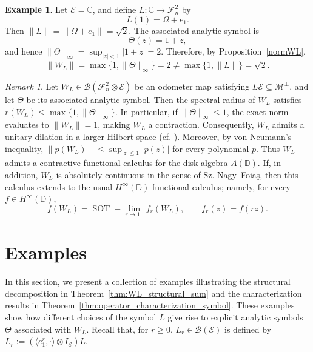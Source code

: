 \documentclass[12pt]{amsart}
\theoremstyle{definition}
\newtheorem{example}[theorem]{Example}
\theoremstyle{remark}
\newtheorem{remark}[theorem]{Remark}
\def \D{\mathbb{D}}
\newcommand{\clb}{\mathcal{B}}
\newcommand{\cle}{\mathcal{E}}
\newcommand{\clm}{\mathcal{M}}
\newcommand{\clf}{\mathcal{F}}
\numberwithin{equation}{section}
\begin{document}
\begin{example}
Let $\cle = \mathbb{C}$, and define $L: \mathbb C \to \clf_n^2 $ by
\[
L(1)=\Omega + e_1.
\]
Then $\|L\|
=
\|\Omega + e_1\|
=
\sqrt{2}.$
The associated analytic symbol is
\[
\Theta(z)=1+z,
\]
and hence $\|\Theta\|_\infty
=
\sup_{|z|<1}|1+z|
=
2.$
Therefore, by Proposition~\ref{normWL},
$$\|W_L\|
=
\max\{1,\|\Theta\|_\infty\}
=
2
\neq
\max\{1,\|L\|\}
=
\sqrt{2}.$$
\end{example}

\begin{remark}
Let $W_L \in \clb(\clf_n^2\otimes\cle)$ be an odometer map satisfying
$L\cle\subseteq \clm^\perp$, and let $\Theta$ be its associated analytic
symbol. Then the spectral radius of $W_L$ satisfies $r(W_L)\le \max\{1,\|\Theta\|_\infty\}.$
In particular, if $\|\Theta\|_\infty\le 1$,  the exact norm evaluates to $\|W_L\| = 1$, making $W_L$ a contraction. Consequently, $W_L$ admits a unitary dilation in a larger Hilbert space (cf. \cite{SzNagyFoias,Paulsen2002,Pisier2001}). Moreover, by von Neumann's inequality,
$\|p(W_L)\| \le \sup_{|z|\le 1}|p(z)|$
for every polynomial $p$. Thus \(W_L\) admits a contractive functional calculus for the disk algebra \(A(\D)\). If, in addition, \(W_L\) is absolutely continuous in the sense of Sz.-Nagy--Foia\c{s}, then this calculus extends to the usual
\(H^\infty(\D)\)-functional calculus; namely, for every \(f\in H^\infty(\D)\),
\[
f(W_L)=\operatorname{SOT}\!-\!\lim_{r\to 1^-} f_r(W_L),
\qquad f_r(z)=f(rz).
\]
\end{remark}



\section{Examples}\label{sec:Examples}
In this section, we present a collection of examples illustrating the
structural decomposition in Theorem~\ref{thm:WL_structural_sum} and the
characterization results in Theorem~\ref{thm:operator_characterization_symbol}.
These examples show how different choices of the symbol \(L\) give rise to
explicit analytic symbols \(\Theta\) associated with \(W_L\). Recall that, for $r \geq 0$, \(L_r\in\clb(\cle)\) is defined by $L_r:=(\langle e_1^r,\cdot\rangle\otimes I_\cle)L.$
\end{document}
